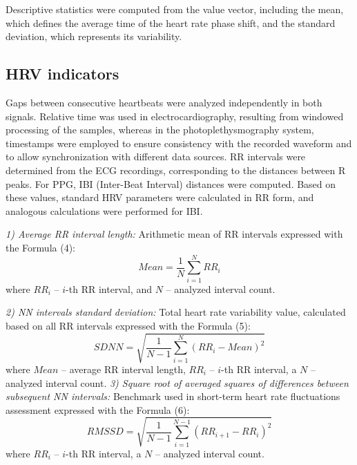 \documentclass{citask}
\begin{document}
Descriptive statistics were computed from the value vector, including the mean, which defines the average time of the heart rate phase shift, and the standard deviation, which represents its variability.

\subsection{HRV indicators}
Gaps between consecutive heartbeats were analyzed independently in both signals. Relative time was used in electrocardiography, resulting from windowed processing of the samples, whereas in the photoplethysmography system, timestamps were employed to ensure consistency with the recorded waveform and to allow synchronization with different data sources. RR intervals were determined from the ECG recordings, corresponding to the distances between R peaks. For PPG, IBI (Inter-Beat Interval) distances were computed. Based on these values, standard HRV parameters were calculated in RR form, and analogous calculations were performed for IBI.

\noindent\textit{1) Average RR interval length:} 
Arithmetic mean of RR intervals expressed with the Formula (4):
\begin{equation}
    Mean = \frac{1}{N} \sum_{i=1}^{N} RR_i
\end{equation}
where $RR_i$ -- $i$-th RR interval, and $N$ – analyzed interval count.

\noindent\textit{2) NN intervals standard deviation:} 
Total heart rate variability value, calculated based on all RR intervals expressed with the Formula (5):%
\begin{equation}
    SDNN = \sqrt{\frac{1}{N-1} \sum_{i=1}^{N} (RR_i - Mean)^2}
\end{equation}
where $Mean$ – average RR interval length, $RR_i$ – $i$-th RR interval, a $N$ – analyzed interval count. 
\newpage
\noindent\textit{3) Square root of averaged squares of differences between subsequent NN intervals:} 
Benchmark used in short-term heart rate fluctuations assessment expressed with the Formula (6):
\begin{equation}
    RMSSD = \sqrt{\frac{1}{N-1} \sum_{i=1}^{N-1} (RR_{i+1} - RR_i)^2}
\end{equation}
where $RR_i$ -- $i$-th RR interval, a $N$ – analyzed interval count.
\end{document}
